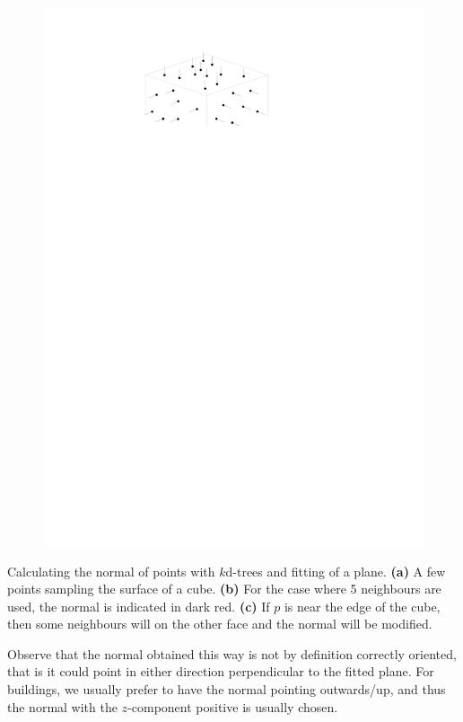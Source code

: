 \begin{marginfigure}
\begin{subfigure}[b]{\linewidth}
    \includegraphics[width=\textwidth,page=3]{normal.pdf}
    \caption{}\label{fig:normal:c}
  \end{subfigure}
  \caption{Calculating the normal of points with $k$d-trees and fitting of a plane. \textbf{(a)} A few points sampling the surface of a cube. \textbf{(b)} For the case where 5 neighbours are used, the normal is indicated in dark red. \textbf{(c)} If $p$ is near the edge of the cube, then some neighbours will on the other face and the normal will be modified.}%
\label{fig:knn_normal}
\end{marginfigure}

%

Observe that the normal obtained this way is not by definition correctly oriented, that is it could point in either direction perpendicular to the fitted plane.
For buildings, we usually prefer to have the normal pointing outwards/up, and thus the normal with the $z$-component positive is usually chosen.

